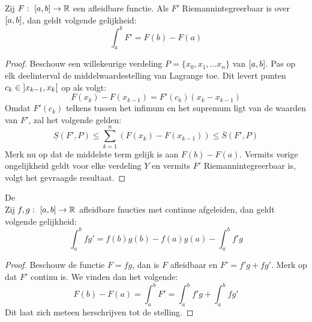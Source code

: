 \documentclass[main.tex]{subfiles}
\begin{document}
\begin{bst}
  Zij $F:\ \interval{a}{b} \rightarrow \mathbb{R}$ een afleidbare functie.
  Als $F'$ Riemannintegreerbaar is over $\interval{a}{b}$, dan geldt volgende gelijkheid:
  \[ \int_{a}^{b}F' = F(b) - F(a) \]

  \begin{proof}
    Beschouw een willekeurige verdeling $P = \{x_{0},x_{1},\dotsc x_{n}\}$ van $\interval{a}{b}$.
    Pas op elk deelinterval de middelwaardestelling van Lagrange toe.
    Dit levert punten $c_{k}\in\interval[open]{x_{k-1}}{x_{k}}$ op als volgt:
    \[ F(x_{k})-F(x_{k-1}) = F'(c_{k})(x_{k}-x_{k-1}) \]
    Omdat $F'(c_{k})$ telkens tussen het infimum en het supremum ligt van de waarden van $F'$, zal het volgende gelden:
    \[ \underline{S}(F',P) \le \sum_{k=1}^{n}(F(x_{k})-F(x_{k-1})) \le \overline{S}(F',P) \]
    Merk nu op dat de middelste term gelijk is aan $F(b)-F(a)$.
    Vermits vorige ongelijkheid geldt voor elke verdeling $Y$ en vermits $F'$ Riemannintegreerbaar is, volgt het gevraagde resultaat.
  \end{proof}
\end{bst}

\begin{bpr}
  De \\
  Zij $f,g:\ \interval{a}{b} \rightarrow \mathbb{R}$ afleidbare fnucties met continue afgeleiden, dan geldt volgende gelijkheid:
  \[ \int_{a}^{b}fg' = f(b)g(b)-f(a)g(a) - \int_{a}^{b}f'g \]

  \begin{proof}
    Beschouw de functie $F = fg$, dan is $F$ afleidbaar en $F' = f'g + fg'$.
    Merk op dat $F'$ continu is.\waarom
    We vinden dan het volgende:\needed\needed
    \[ F(b) - F(a) = \int_{a}^{b}F' = \int_{a}^{b}f'g + \int_{a}^{b}fg' \]
    Dit laat zich meteen herschrijven tot de stelling.
  \end{proof}
\end{bpr}
\end{document}
